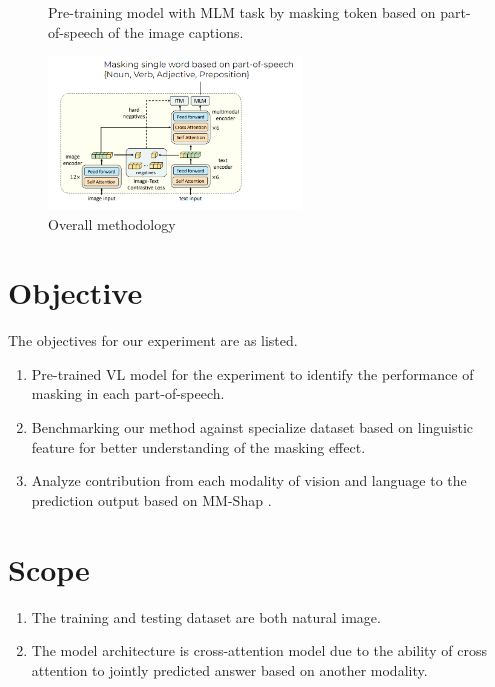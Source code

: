 \begin{figure}[h]
    \caption{Overall methodology}
    \label{fig:overview}
    Pre-training model with MLM task by masking token based on part-of-speech of the image captions.
    \begin{center}
        \includegraphics[width=0.6\textwidth]{Images/overview.png}
    \end{center}
    \small
\end{figure}

\section{Objective}
The objectives for our experiment are as listed.
\begin{enumerate}
    \item Pre-trained VL model for the experiment to identify the performance of masking in each part-of-speech.
    \item Benchmarking our method against specialize dataset based on linguistic feature \cite{valse} for better understanding of the masking effect.
    \item Analyze contribution from each modality of vision and language to the prediction output based on MM-Shap \cite{mm-shap}.
\end{enumerate}

\section{Scope}
\begin{enumerate}
    \item The training and testing dataset are both natural image.
    \item The model architecture is cross-attention model due to the ability of cross attention to jointly predicted answer based on another modality.
\end{enumerate}


